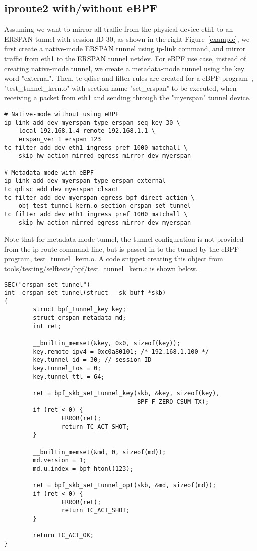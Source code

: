 \documentclass{sigplanconf}
\begin{document}
\subsection{iproute2 with/without eBPF}\label{iproute2}
Assuming we want to mirror all traffic from the physical device eth1
to an ERSPAN tunnel with session ID 30, as shown in the right Figure~\ref{example},
we first create a native-mode ERSPAN tunnel using ip-link command,
and mirror traffic from eth1 to the ERSPAN tunnel netdev.
For eBPF use case, instead of creating native-mode tunnel, we create
a metadata-mode tunnel using the key word "external".
Then, tc qdisc and filter rules are created for a eBPF program~\cite{daniel1,daniel2},
"test\_tunnel\_kern.o" with section name "set\_erspan" to be executed,
when receiving a packet from eth1 and sending through the "myerspan"
tunnel device.

\begin{verbatim}
# Native-mode without using eBPF
ip link add dev myerspan type erspan seq key 30 \
    local 192.168.1.4 remote 192.168.1.1 \
    erspan_ver 1 erspan 123
tc filter add dev eth1 ingress pref 1000 matchall \
    skip_hw action mirred egress mirror dev myerspan

# Metadata-mode with eBPF
ip link add dev myerspan type erspan external
tc qdisc add dev myerspan clsact
tc filter add dev myerspan egress bpf direct-action \
    obj test_tunnel_kern.o section erspan_set_tunnel
tc filter add dev eth1 ingress pref 1000 matchall \
    skip_hw action mirred egress mirror dev myerspan
\end{verbatim}

Note that for metadata-mode tunnel, the tunnel configuration is not
provided from the ip route command line, but is passed in to the tunnel
by the eBPF program, test\_tunnel\_kern.o. A code snippet creating this
object from tools/testing/selftests/bpf/test\_tunnel\_kern.c is shown below.
{\scriptsize
\begin{verbatim}
SEC("erspan_set_tunnel")
int _erspan_set_tunnel(struct __sk_buff *skb)
{
        struct bpf_tunnel_key key;
        struct erspan_metadata md; 
        int ret;

        __builtin_memset(&key, 0x0, sizeof(key));
        key.remote_ipv4 = 0xc0a80101; /* 192.168.1.100 */
        key.tunnel_id = 30; // session ID
        key.tunnel_tos = 0;
        key.tunnel_ttl = 64;

        ret = bpf_skb_set_tunnel_key(skb, &key, sizeof(key),
                                     BPF_F_ZERO_CSUM_TX);
        if (ret < 0) {
                ERROR(ret);
                return TC_ACT_SHOT;
        }

        __builtin_memset(&md, 0, sizeof(md));
        md.version = 1;
        md.u.index = bpf_htonl(123);

        ret = bpf_skb_set_tunnel_opt(skb, &md, sizeof(md));
        if (ret < 0) {
                ERROR(ret);
                return TC_ACT_SHOT;
        }

        return TC_ACT_OK;
}
\end{verbatim}
}
\end{document}
